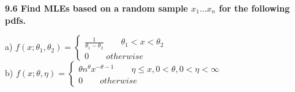 \bf{9.6} Find MLEs based on a random sample $x_{1}...x_{n}$ for the following pdfs.

\noindent a) $f(x;\theta_{1},\theta_{2} )=\begin{cases} \frac{1}{\theta_{1}-\theta_{2}}\qquad \theta_{1}<x<\theta_{2} \\ 0\qquad otherwise \end{cases}$\\



\noindent b) $f(x;\theta, \eta )=\begin{cases} \theta n^{\theta}x^{-\theta-1}\qquad \eta \le x, 0<\theta, 0<\eta<\infty \\ 0\qquad otherwise \end{cases}$\\
